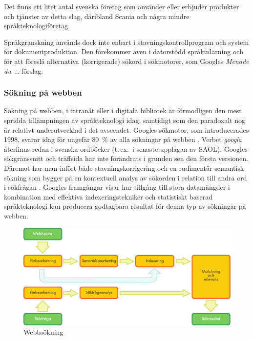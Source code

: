 \begin{multicols}{2}
Det finns ett litet antal svenska företag som använder eller erbjuder
produkter och tjänster av detta slag, däribland Scania och några
mindre språkteknologiföretag.

Språkgranskning används dock inte enbart i
stav\-nings\-kon\-troll\-pro\-gram och system för
dokumentproduktion. Den förekommer även i datorstödd språkinlärning
och för att föreslå alternativa (korrigerade) sökord i sökmotorer, som
Googles \textit{Menade du~\ldots}-förslag.


\subsubsection{Sökning på webben}

Sökning på webben, i intranät eller i digitala bib\-lio\-tek är
förmodligen den mest spridda tillämp\-ning\-en av språkteknologi idag,
samtidigt som den paradoxalt nog är relativt underutvecklad i det
avseendet. Googles sökmotor, som introducerades 1998, svarar idag för
ungefär 80~\% av alla sökningar på webben \cite{spi1}. Verbet
\textit{googla} återfinns redan i svenska ordböcker (t.\,ex.~i senaste
upplagan av SAOL). Googles sökgränssnitt och träffsida har inte
förändrats i grunden sen den första versionen. Däremot har man infört
både stavningskorrigering och en rudimentär semantisk sökning som
bygger på en kontextuell analys av sökorden i relation till andra ord
i sökfrågan \cite{pc1}. Googles framgångar visar hur tillgång till
stora datamängder i kombination med effektiva
in\-dex\-er\-ings\-tek\-nik\-er och statistiskt baserad språkteknologi
kan producera godtagbara resultat för denna typ av sökningar på
webben.


\begin{figure}[htb]
  \center
  \includegraphics[width=\textwidth]{../_media/swedish/web_search_architecture}
  \caption{Webbsökning}
  \label{fig:websearcharch_sv}
\end{figure}


\end{multicols}
